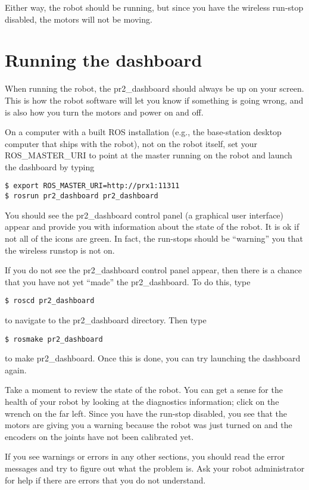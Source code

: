 Either way, the robot should be running, but since you have the wireless run-stop disabled, the motors will not be moving.  

\section{Running the dashboard}
When running the robot, the pr2\_dashboard should always be up on your screen.  This is how the robot software will 
let you know if something is going wrong, and is also how you turn the motors and power on and off.  

On a computer with a built ROS installation (e.g., the base-station desktop computer that ships with the robot), not on the robot itself, set your ROS\_MASTER\_URI to point at the master running on the robot and launch the dashboard by typing
\begin{verbatim}
$ export ROS_MASTER_URI=http://prx1:11311
$ rosrun pr2_dashboard pr2_dashboard
\end{verbatim}
You should see the pr2\_dashboard control panel (a graphical user interface) appear and provide you with information about the state of the robot. It is ok if not all of the icons are green. In fact, the run-stops should be ``warning'' you that the wireless runstop is not on. 

If you do not see the pr2\_dashboard control panel appear, then there is a chance that you have not yet ``made'' the pr2\_dashboard. To do this, type
\begin{verbatim}
$ roscd pr2_dashboard
\end{verbatim}
to navigate to the pr2\_dashboard directory. Then type
\begin{verbatim}
$ rosmake pr2_dashboard
\end{verbatim}
to make pr2\_dashboard. Once this is done, you can try launching the dashboard again.

Take a moment to review the state of the robot. You can get a sense for the health of 
your robot by looking at the diagnostics information; click on the wrench on the far left.  Since you have the run-stop disabled, you see that the motors are giving you a warning because the robot was just turned on and the encoders on the joints have not 
been calibrated yet. 

If you see warnings or errors in any other sections, you should read the error messages and try to figure out what the 
problem is.  Ask your robot administrator for help if there are errors that you do not understand.
